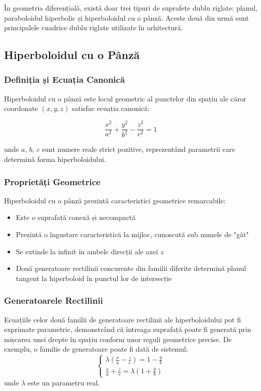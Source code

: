 \documentclass[12pt,a4paper]{article}
\begin{document}
În geometria diferențială, există doar trei tipuri de suprafețe dublu riglate: planul, paraboloidul hiperbolic și hiperboloidul cu o pânză. Aceste două din urmă sunt principalele cuadrice dublu riglate utilizate în arhitectură.

\subsection{Hiperboloidul cu o Pânză}

\subsubsection{Definiția și Ecuația Canonică}

Hiperboloidul cu o pânză este locul geometric al punctelor din spațiu ale căror coordonate $(x, y, z)$ satisfac ecuația canonică:

\begin{equation}
\frac{x^2}{a^2} + \frac{y^2}{b^2} - \frac{z^2}{c^2} = 1
\end{equation}

unde $a$, $b$, $c$ sunt numere reale strict pozitive, reprezentând parametrii care determină forma hiperboloidului.

\subsubsection{Proprietăți Geometrice}

Hiperboloidul cu o pânză prezintă caracteristici geometrice remarcabile:

\begin{itemize}
    \item Este o suprafață conexă și necompactă
    \item Prezintă o îngustare caracteristică la mijloc, cunoscută sub numele de "gât"
    \item Se extinde la infinit în ambele direcții ale axei $z$
    \item Două generatoare rectilinii concurente din familii diferite determină planul tangent la hiperboloid în punctul lor de intersecție
\end{itemize}

\subsubsection{Generatoarele Rectilinii}
Ecuațiile celor două familii de generatoare rectilinii ale hiperboloidului pot fi exprimate parametric, demonstrând că întreaga suprafață poate fi generată prin mișcarea unei drepte în spațiu conform unor reguli geometrice precise. De exemplu, o familie de generatoare poate fi dată de sistemul:
\[
\begin{cases}
    \lambda \left( \frac{x}{a} - \frac{z}{c} \right) = 1 - \frac{y}{b} \\
    \frac{x}{a} + \frac{z}{c} = \lambda \left( 1 + \frac{y}{b} \right)
\end{cases}
\]
unde $\lambda$ este un parametru real.
\end{document}

